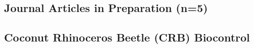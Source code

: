 \subsection{Journal Articles in Preparation (n=5)}
\begin{refsection}
	
	\nocite{moore_first_nodate-1,moore_mariana_2013,moore_three_nodate-1,moore_change_nodate,moore_coconut_nodate-1}
	
	\printbibliography[heading=none]
\end{refsection}


\subsection{Coconut Rhinoceros Beetle (CRB) Biocontrol}\label{sec:coconut-rhinoceros-beetle-(crb)-biocontrol}

